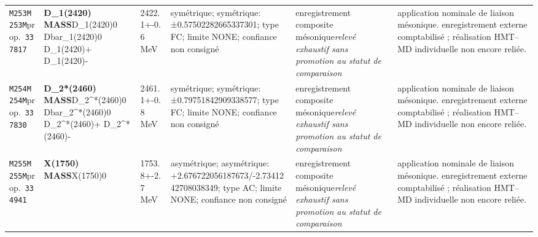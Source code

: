 \begin{landscape}
\begin{longtable}{L{1.85cm}L{4.45cm}L{2.35cm}L{4.05cm}L{3.35cm}L{7.15cm}}
\texttt{M253}\newline \texttt{M253M}\newline prop.\ \texttt{337817} & \textbf{D\_\allowbreak{}1(2420) MASS}\newline D\_\allowbreak{}1(2420)0 \textbar{}\allowbreak{} Dbar\_\allowbreak{}1(2420)0 \textbar{}\allowbreak{} D\_\allowbreak{}1(2420)+ \textbar{}\allowbreak{} D\_\allowbreak{}1(2420)- & 2422.1+-0.6\,MeV & symétrique; symétrique: ±0.57502282665337301; type FC; limite NONE; confiance non consigné & enregistrement composite mésonique\newline \emph{relevé exhaustif sans promotion au statut de comparaison} & application nominale de liaison mésonique. enregistrement externe comptabilisé ; réalisation HMT--MD individuelle non encore reliée. \\
\texttt{M254}\newline \texttt{M254M}\newline prop.\ \texttt{337830} & \textbf{D\_\allowbreak{}2*(2460) MASS}\newline D\_\allowbreak{}2\textasciicircum{}*(2460)0 \textbar{}\allowbreak{} Dbar\_\allowbreak{}2\textasciicircum{}*(2460)0 \textbar{}\allowbreak{} D\_\allowbreak{}2\textasciicircum{}*(2460)+ \textbar{}\allowbreak{} D\_\allowbreak{}2\textasciicircum{}*(2460)- & 2461.1+-0.8\,MeV & symétrique; symétrique: ±0.79751842909338577; type FC; limite NONE; confiance non consigné & enregistrement composite mésonique\newline \emph{relevé exhaustif sans promotion au statut de comparaison} & application nominale de liaison mésonique. enregistrement externe comptabilisé ; réalisation HMT--MD individuelle non encore reliée. \\
\texttt{M255}\newline \texttt{M255M}\newline prop.\ \texttt{334941} & \textbf{X(1750) MASS}\newline X(1750)0 & 1753.8+-2.7\,MeV & asymétrique; asymétrique: +2.676722056187673/-2.7341242708038349; type AC; limite NONE; confiance non consigné & enregistrement composite mésonique\newline \emph{relevé exhaustif sans promotion au statut de comparaison} & application nominale de liaison mésonique. enregistrement externe comptabilisé ; réalisation HMT--MD individuelle non encore reliée. \\

\end{longtable}
\end{landscape}
